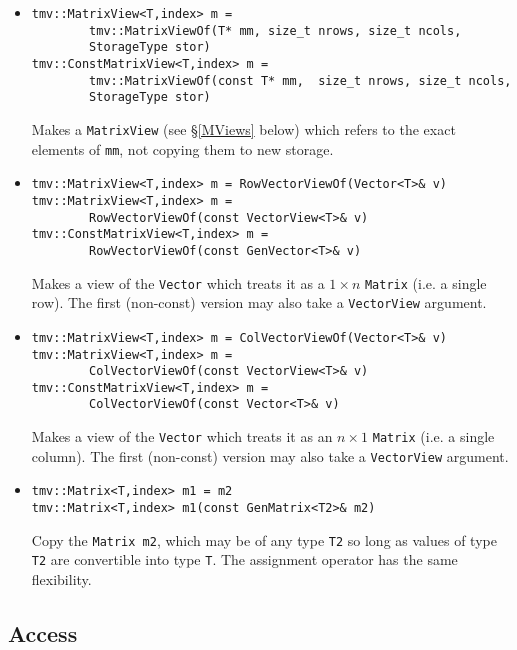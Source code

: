 \documentclass[twoside,letterpaper,11pt]{article}
\renewcommand{\tt}[1]{{\texttt {#1}}}
\begin{document}
\begin{itemize}
\item
\begin{verbatim}
tmv::MatrixView<T,index> m = 
        tmv::MatrixViewOf(T* mm, size_t nrows, size_t ncols, 
        StorageType stor)
tmv::ConstMatrixView<T,index> m = 
        tmv::MatrixViewOf(const T* mm,  size_t nrows, size_t ncols, 
        StorageType stor)
\end{verbatim}
Makes a \tt{MatrixView} (see \S\ref{MViews} below) which refers to the exact
elements of \tt{mm}, not copying them to new storage.

\item
\begin{verbatim}
tmv::MatrixView<T,index> m = RowVectorViewOf(Vector<T>& v)
tmv::MatrixView<T,index> m = 
        RowVectorViewOf(const VectorView<T>& v)
tmv::ConstMatrixView<T,index> m = 
        RowVectorViewOf(const GenVector<T>& v)
\end{verbatim}
Makes a view of the \tt{Vector} which treats it as a $1\times n$ \tt{Matrix}
(i.e. a single row).  The first (non-const) version may also take a
\tt{VectorView} argument.

\item
\begin{verbatim}
tmv::MatrixView<T,index> m = ColVectorViewOf(Vector<T>& v)
tmv::MatrixView<T,index> m = 
        ColVectorViewOf(const VectorView<T>& v)
tmv::ConstMatrixView<T,index> m = 
        ColVectorViewOf(const Vector<T>& v)
\end{verbatim}
Makes a view of the \tt{Vector} which treats it as an $n \times 1$ \tt{Matrix}
(i.e. a single column).  The first (non-const) version may also take a
\tt{VectorView} argument.

\item
\begin{verbatim}
tmv::Matrix<T,index> m1 = m2
tmv::Matrix<T,index> m1(const GenMatrix<T2>& m2)
\end{verbatim}
Copy the \tt{Matrix m2}, which may be of any type \tt{T2} so long
as values of type \tt{T2} are convertible into type \tt{T}.
The assignment operator has the same flexibility.

\end{itemize}


\subsection{Access}
\end{document}
